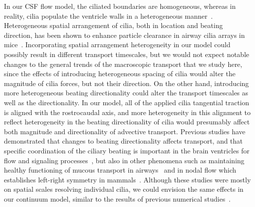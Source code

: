 \documentclass[fleqn]{wlscirep}
\begin{document}
In our CSF flow model, the ciliated boundaries are homogeneous,
whereas in reality, cilia populate the ventricle walls in a
heterogeneous manner~\cite{Olstad2019CiliaryDevelopment}. Heterogeneous spatial
arrangement of cilia, both in location and beating direction,
has been shown to enhance particle clearance in airway cilia arrays
in mice~\cite{Ramirez-SanJuan2020Multi-scaleArrays}. Incorporating spatial arrangement heterogeneity
in our model could possibly result in different transport timescales,
but we would not expect notable changes to the general trends of the macroscopic
transport that we study here, since the effects of introducing heterogeneous spacing
of cilia would alter the magnitude of cilia forces, but not their direction.
On the other hand, introducing more heterogeneous beating directionality could
alter the transport timescales as well as the directionality. In our model, all of the applied cilia
tangential traction is aligned with the rostrocaudal axis, and more heterogeneity
in this alignment to reflect heterogeneity in the beating directionality of
cilia would presumably affect both magnitude and directionality of advective transport.
Previous studies have demonstrated that changes to beating directionality affects transport,
and that specific coordination of the ciliary beating is important in the brain ventricles for
flow and signaling processes~\cite{Eichele2020Cilia-drivenVentricle, Olstad2019CiliaryDevelopment,
Faubel2016Cilia-basedVentricles, Guirao2010CouplingCilia, Afzelius2004Cilia-relatedDiseases},
but also in other phenomena such as maintaining healthy functioning of mucous transport in
airways~\cite{Rayner1996CiliarySyndrome, Schneiter2021Multi-scaleFunction,
Bustamante-Marin2019LackClearance, Tsukita2012CoordinatedFeet} and in nodal flow which establishes
left-right symmetry in mammals~\cite{Yoshiba2014RolesSymmetry, Hirokawa2006NodalAsymmetry,
Sawamoto2006NewBrain}. Although these studies were mostly on spatial scales resolving individual cilia,
we could envision the same effects in our continuum model,
similar to the results of previous numerical studies~\cite{Ramirez-SanJuan2020Multi-scaleArrays,
Thouvenin2020OriginCanal, Yoshida2022EffectVentricles}. 
\end{document}

